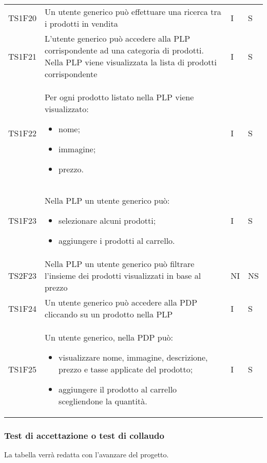 {\begin{longtable}{C{2cm} C{9.6cm} C{1.5cm} C{1cm}}
TS1F20 & Un utente generico può effettuare una ricerca tra i prodotti in vendita & I & S\\

TS1F21 & L'utente generico può accedere alla PLP corrispondente ad una categoria di prodotti. Nella PLP viene visualizzata la lista di prodotti corrispondente & I & S\\

TS1F22 & Per ogni prodotto listato nella PLP viene visualizzato:
\begin{itemize}
	\item nome;
	\item immagine;
	\item prezzo.
\end{itemize} & I & S\\

TS1F23 & Nella PLP un utente generico può:
\begin{itemize}
	\item selezionare alcuni prodotti;
	\item aggiungere i prodotti al carrello.
\end{itemize} & I & S\\

TS2F23 & Nella PLP un utente generico può filtrare l'insieme dei prodotti visualizzati in base al prezzo & NI & NS\\

TS1F24 & Un utente generico può accedere alla PDP cliccando su un prodotto nella PLP & I & S\\

TS1F25 & Un utente generico, nella PDP può:
\begin{itemize}
	\item visualizzare nome, immagine, descrizione, prezzo e tasse applicate del prodotto;
	\item aggiungere il prodotto al carrello scegliendone la quantità.
\end{itemize} & I & S\\



\end{longtable}


}
\subsubsection{Test di accettazione o test di collaudo}
La tabella verrà redatta con l'avanzare del progetto.